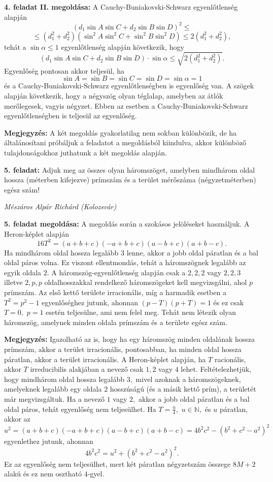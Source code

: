 \documentclass[a4paper,10pt]{article}
\def\ki#1#2{\hfill {\it #1 (#2)}\medskip}
\begin{document}
\medskip

\textbf{4. feladat II. megoldása: } A Cauchy-Buniakovski-Schwarz
egyenlőtlenség alapján
$$(d_1\sin{A}\sin{C}+d_2\sin{B}\sin{D})^2\leq$$
$$\leq \left(d_1^2+d_2^2 \right)\left (\sin^2 A \sin^2 C+\sin^2 B\sin^2 D
\right )\leq 2\left(d_1^2+d_2^2 \right),$$ tehát a  $\sin
\alpha\leq 1$ egyenlőtlenség alapján következik, hogy
$$(d_1\sin{A}\sin{C}+d_2\sin{B}\sin{D})\cdot\sin{\alpha}\leq
\sqrt{2(d_1^2+d_2^2)}.$$ Egyenlőség pontosan akkor teljesül,
ha
$$\sin{A}=\sin{B}=\sin{C}=\sin{D}=\sin{\alpha}=1$$ és a Cauchy-Buniakovski-Schwarz
egyenlőtlenségben is egyenlő\-ség van. A szögek
alapján következik, hogy a négyszög olyan téglalap,
amelyben az átlók merőlegesek, vagyis négyzet. Ebben az
esetben a Cauchy-Buniakovski-Schwarz egyenlőtlenségben is
teljesül az egyenlőség.

\medskip

\textbf{Megjegyzés:} A két megoldás gyakorlatilag nem sokban
kü\-lön\-bözik, de ha általánosítani próbáljuk a
feladatot a megoldásból kiindulva, akkor különböző
tulajdonságokhoz juthatunk a két megoldás alapján.

\medskip

{\bf 5. feladat: } Adjuk meg az összes olyan háromszöget, amelyben mindhárom
oldal hossza (méterben kifejezve) prímszám és a
terület mérőszáma (négyzet\-méterben) egész szám!

\ki{Mészáros Alpár Richárd}{Kolozsvár}\medskip

\textbf{5. feladat megoldása: } A megoldás során a szokásos jelöléseket használjuk.
A Heron-képlet alapján
\[16T^2=(a+b+c)(-a+b+c)(a-b+c)(a+b-c).\] Ha mindhárom
oldal hossza legalább $3$ lenne, akkor a jobb oldal páratlan
és a bal oldal páros volna. Ez viszont ellentmondás, tehát a
háromszögnek legalább az egyik oldala $2.$ A
háromszög-egyenlőtlenség alapján csak a $2,2,2$ vagy
$2,2,3$ illetve $2,p,p$ oldalhosszakkal rendelkező
háromszögeket kell megvizsgálni, ahol $p$ prímszám. Az
első kettő területe irracionális, míg a harmadik esetben
a $T^2=p^2-1$ egyenlőséghez jutunk, ahonnan $(p-T)(p+T)=1$ és
ez csak $T=0,$ $p=1$ esetén teljesülne, ami nem felel meg. Tehát
nem létezik olyan háromszög, amelynek minden oldala prímszám és
a területe egész szám.

\medskip

\textbf{Megjegyzés:} Igazolható az is, hogy ha egy háromszög minden
oldalának hossza prímszám, akkor a terület irracionális,
pontosabban, ha minden oldal hossza páratlan, akkor a terület
irracionális. A Heron-képlet alapján, ha $T$ racionális,
akkor $T$ irreducibilis alakjában a nevező csak $1,2$ vagy $4$
lehet. Feltételezhet\-jük, hogy mindhárom oldal hossza
legalább $3,$ mivel azoknak a háromszögeknek, amelyeknek
legalább egy oldala $2$ hosszúságú (és a másik kettő
prím), a területét már megvizsgáltuk. Ha a nevező $1$
vagy $2,$ akkor a jobb oldal páratlan és a bal oldal páros,
tehát egyenlőség nem teljesülhet. Ha $T=\frac{u}{4},$ $u\in
\mathbb{N},$ és $u$ páratlan, akkor az
\[u^2=(a+b+c)(-a+b+c)(a-b+c)(a+b-c)=4b^2c^2-(b^2+c^2-a^2)^2\]
egyenlethez jutunk, ahonnan  $$4b^2c^2=u^2+(b^2+c^2-a^2)^2.$$ Ez az
egyenlőség nem teljesülhet, mert két páratlan
négyzetszám összege $8M+2$ alakú és ez nem osztható
$4$-gyel.
\end{document}
